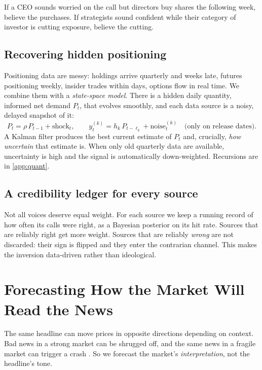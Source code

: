 \documentclass[11pt,a4paper]{article}
\theoremstyle{plain}
\theoremstyle{definition}
\begin{document}
\begin{plainwords}
If a CEO sounds worried on the call but directors buy shares the following week, believe the purchases. If strategists sound confident while their category of investor is cutting exposure, believe the cutting.
\end{plainwords}

\subsection{Recovering hidden positioning}

Positioning data are messy: holdings arrive quarterly and weeks late, futures positioning weekly, insider trades within days, options flow in real time. We combine them with a \emph{state-space model}. There is a hidden daily quantity, informed net demand $P_t$, that evolves smoothly, and each data source is a noisy, delayed snapshot of it:
\begin{equation}
  P_t = \rho\, P_{t-1} + \text{shock}_t, \qquad
  y^{(k)}_t = h_k\, P_{t-\ell_k} + \text{noise}^{(k)}_t \quad \text{(only on release dates)} .
\end{equation}
A Kalman filter produces the best current estimate of $P_t$ and, crucially, \emph{how uncertain} that estimate is. When only old quarterly data are available, uncertainty is high and the signal is automatically down-weighted. Recursions are in \cref{app:quant}.

\subsection{A credibility ledger for every source}\label{sec:credibility}

Not all voices deserve equal weight. For each source we keep a running record of how often its calls were right, as a Bayesian posterior on its hit rate. Sources that are reliably right get more weight. Sources that are reliably \emph{wrong} are not discarded: their sign is flipped and they enter the contrarian channel. This makes the inversion data-driven rather than ideological.

\section{Forecasting How the Market Will Read the News}\label{sec:interpretation}

The same headline can move prices in opposite directions depending on context. Bad news in a strong market can be shrugged off, and the same news in a fragile market can trigger a crash \citep{veronesi1999}. So we forecast the market's \emph{interpretation}, not the headline's tone.
\end{document}
